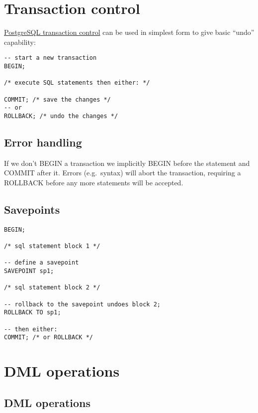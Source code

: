 \section{Transaction control}
\label{sec:transaction-control}

\href{https://www.postgresql.org/docs/15/tutorial-transactions.html}{PostgreSQL
transaction control} can be used in simplest form to give basic ``undo''
capability:

\begin{verbatim}
-- start a new transaction
BEGIN;

/* execute SQL statements then either: */

COMMIT; /* save the changes */
-- or
ROLLBACK; /* undo the changes */
\end{verbatim}

\subsection{Error handling}
\label{sec:error-handling}

If we don't BEGIN a transaction we implicitly BEGIN before the statement
and COMMIT after it. Errors (e.g.~syntax) will abort the transaction,
requiring a ROLLBACK before any more statements will be accepted.

\subsection{Savepoints}\label{savepoints}

\begin{verbatim}
BEGIN;

/* sql statement block 1 */

-- define a savepoint
SAVEPOINT sp1;

/* sql statement block 2 */

-- rollback to the savepoint undoes block 2; 
ROLLBACK TO sp1;

-- then either:
COMMIT; /* or ROLLBACK */
\end{verbatim}

\section{DML operations}

\subsection{DML operations}

